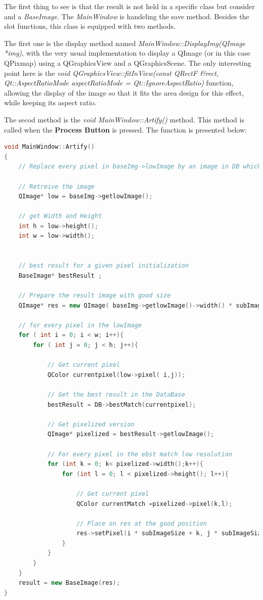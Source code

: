 \documentclass[aps,letterpaper,11pt]{revtex4}
\begin{document}
 The first thing to see is that the result is not held in a specific class but consider and a \textit{BaseImage}. The \textit{MainWindow} is handeling the save method. 
 Besides the slot functions, this class is equipped with two methods.
 
The first one is the display method named \textit{MainWindow::DisplayImg(QImage *img)}, with the very usual implementation to display a QImage (or in this case QPixmap) using a QGraphicsView and a QGraphicsScene. The only interesting point here is the \textit{void QGraphicsView::fitInView(const QRectF \&rect, Qt::AspectRatioMode aspectRatioMode = Qt::IgnoreAspectRatio)} function, allowing the display of the image so that it fits the area design for this effect, while keeping its aspect ratio.

The secod method is the \textit{void MainWindow::Artify()} method. This method is called when the \textbf{Process Button} is pressed. The function is presented below:

\begin{lstlisting}[language=C++]
void MainWindow::Artify()
{
    // Replace every pixel in baseImg->lowImage by an image in DB which is the best match

    // Retreive the image
    QImage* low = baseImg->getlowImage();

    // get Width and Height
    int h = low->height();
    int w = low->width();


    // best result for a given pixel initialization
    BaseImage* bestResult ;

    // Prepare the result image with good size
    QImage* res = new QImage( baseImg->getlowImage()->width() * subImageSize, baseImg->getlowImage()->height() * subImageSize, QImage::Format_RGB32);

    // for every pixel in the lowImage
    for ( int i = 0; i < w; i++){
        for ( int j = 0; j < h; j++){

            // Get current pixel
            QColor currentpixel(low->pixel( i,j));

            // Get the best result in the DataBase
            bestResult = DB->bestMatch(currentpixel);

            // Get pixelized version
            QImage* pixelized = bestResult->getlowImage();

            // For every pixel in the ebst match low resolution
            for (int k = 0; k< pixelized->width();k++){
                for (int l = 0; l < pixelized->height(); l++){

                    // Get current pixel
                    QColor currentMatch =pixelized->pixel(k,l);

                    // Place on res at the good position
                    res->setPixel(i * subImageSize + k, j * subImageSize + l, currentMatch.rgb());
                }
            }
        }
    }
    result = new BaseImage(res);
}
\end{lstlisting}
 
\end{document}
